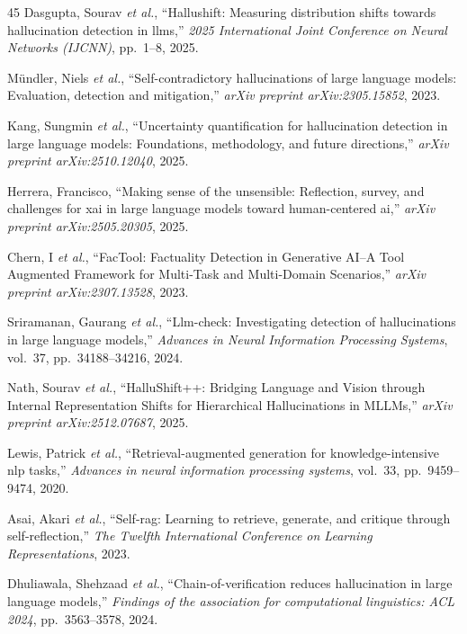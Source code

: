 \documentclass[journal]{IEEEtran}
\begin{document}
\begin{thebibliography}{45}
Dasgupta, Sourav \emph{et al.}, ``Hallushift: Measuring distribution shifts towards hallucination detection in llms,'' \emph{2025 International Joint Conference on Neural Networks (IJCNN)}, pp.~1--8, 2025.

M{\"u}ndler, Niels \emph{et al.}, ``Self-contradictory hallucinations of large language models: Evaluation, detection and mitigation,'' \emph{arXiv preprint arXiv:2305.15852}, 2023.

Kang, Sungmin \emph{et al.}, ``Uncertainty quantification for hallucination detection in large language models: Foundations, methodology, and future directions,'' \emph{arXiv preprint arXiv:2510.12040}, 2025.

Herrera, Francisco, ``Making sense of the unsensible: Reflection, survey, and challenges for xai in large language models toward human-centered ai,'' \emph{arXiv preprint arXiv:2505.20305}, 2025.

Chern, I \emph{et al.}, ``FacTool: Factuality Detection in Generative AI--A Tool Augmented Framework for Multi-Task and Multi-Domain Scenarios,'' \emph{arXiv preprint arXiv:2307.13528}, 2023.

Sriramanan, Gaurang \emph{et al.}, ``Llm-check: Investigating detection of hallucinations in large language models,'' \emph{Advances in Neural Information Processing Systems}, vol.~37, pp.~34188--34216, 2024.

Nath, Sourav \emph{et al.}, ``HalluShift++: Bridging Language and Vision through Internal Representation Shifts for Hierarchical Hallucinations in MLLMs,'' \emph{arXiv preprint arXiv:2512.07687}, 2025.

Lewis, Patrick \emph{et al.}, ``Retrieval-augmented generation for knowledge-intensive nlp tasks,'' \emph{Advances in neural information processing systems}, vol.~33, pp.~9459--9474, 2020.

Asai, Akari \emph{et al.}, ``Self-rag: Learning to retrieve, generate, and critique through self-reflection,'' \emph{The Twelfth International Conference on Learning Representations}, 2023.

Dhuliawala, Shehzaad \emph{et al.}, ``Chain-of-verification reduces hallucination in large language models,'' \emph{Findings of the association for computational linguistics: ACL 2024}, pp.~3563--3578, 2024.


\end{thebibliography}
\end{document}
